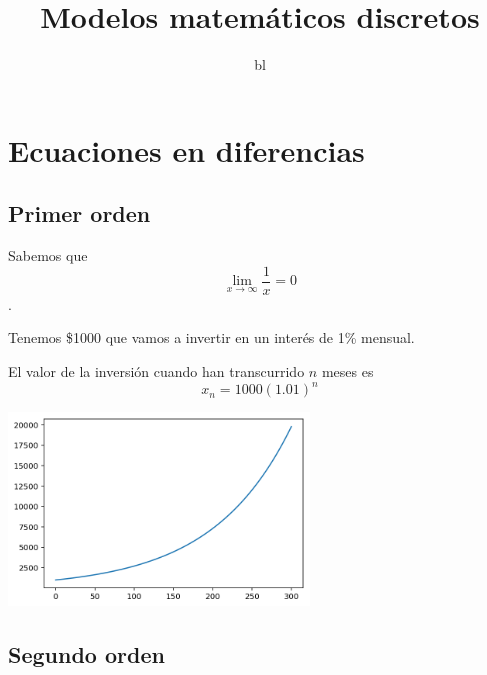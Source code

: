 \documentclass{article}
\title{Modelos matemáticos discretos}
\author{bl}
\begin{document}
\maketitle
\section{Ecuaciones en diferencias}
\subsection{Primer orden}

Sabemos que $$\lim_{x\to\infty}\frac{1}{x}=0$$.

Tenemos \$1000 que vamos a invertir en un interés de 1\% mensual. 

El valor de la inversión cuando han transcurrido $n$ meses es $$x_n=1000(1.01)^n$$

\begin{center}
\includegraphics[width=8cm]{grafica}
\end{center}

\subsection{Segundo orden} 
\end{document}
